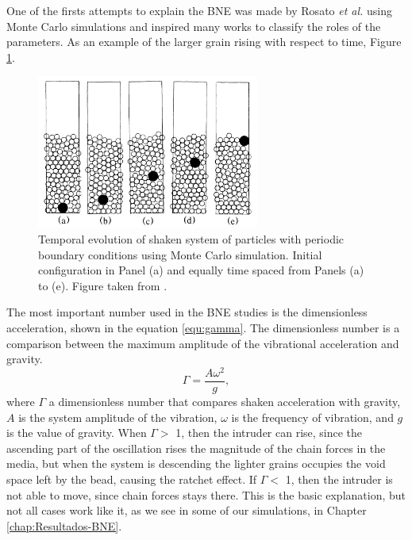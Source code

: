     One of the firsts attempts to explain the BNE was made by Rosato \textit{et al.} \cite{Why_the_Brazil_nuts_are_on_top} using Monte Carlo simulations and inspired many works to classify the roles of the parameters. As an example of the larger grain rising with respect to time, Figure \ref{fig:BNE_rosato}.

\begin{figure}[H]
    \centering
    \includegraphics[width=0.65\textwidth]{04-figuras/BNE_Rosato.png}
    \caption[BNE cycles.]{Temporal evolution of shaken system of particles with periodic boundary conditions using Monte Carlo simulation. Initial configuration in Panel (a) and equally time spaced from Panels (a) to (e). Figure taken from \cite{Why_the_Brazil_nuts_are_on_top}.}
    \label{fig:BNE_rosato}
\end{figure}

    The most important number used in the BNE studies is the dimensionless acceleration, shown in the equation \ref{equ:gamma}. The dimensionless number is a comparison between the maximum amplitude of the vibrational acceleration and gravity. 
\begin{equation}
    \label{equ:gamma}
    \Gamma = \frac{A\omega^{2}}{g},
\end{equation}
where $\Gamma$ a dimensionless number that compares shaken acceleration with gravity, $A$ is the system amplitude of the vibration, $\omega$ is the frequency of vibration, and $g$ is the value of gravity. When $\Gamma > $ 1, then the intruder can rise, since the ascending part of the oscillation rises the magnitude of the chain forces in the media, but when the system is descending the lighter grains occupies the void space left by the bead, causing the ratchet effect. If $\Gamma < $ 1, then the intruder is not able to move, since chain forces stays there. This is the basic explanation, but not all cases work like it, as we see in some of our simulations, in Chapter \ref{chap:Resultados-BNE}.


